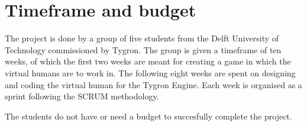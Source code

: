 \section{Timeframe and budget}
The project is done by a group of five students from the Delft University of Technology commissioned by Tygron. The group is given a timeframe of ten weeks, of which the first two weeks are meant for creating a game in which the virtual humans are to work in. The following eight weeks are spent on designing and coding the virtual human for the Tygron Engine. Each week is organised as a sprint following the SCRUM \cite{Rising00} methodology.
\newline

The students do not have or need a budget to succesfully complete the project. \newline
